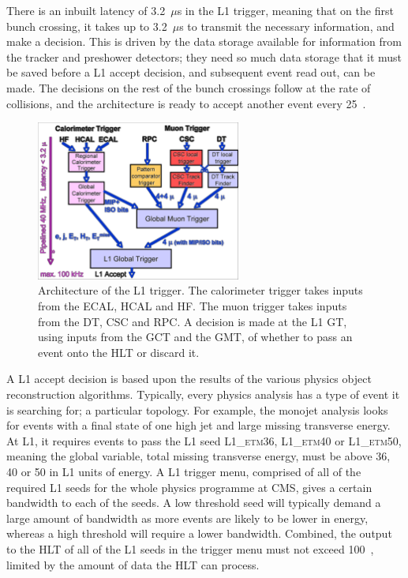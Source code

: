 There is an inbuilt latency of 3.2~$\mu$s in the \ac{L1} trigger, meaning that on the first bunch crossing, it takes up to 3.2~$\mu$s to transmit the necessary information, and make a decision. 
This is driven by the data storage available for information from the tracker and preshower detectors; 
they need so much data storage that it must be saved before a L1 accept decision, and subsequent event read out, can be made.
The decisions on the rest of the bunch crossings follow at the rate of collisions, and the architecture is ready to accept another event every 25~\ns.


\begin{figure}[htbp]
  \begin{center}
  \includegraphics[width=0.6\textwidth]{Figures/detector/L1TriggerArch.pdf}
  \caption{Architecture of the \ac{L1} trigger. The calorimeter trigger takes inputs from the \ac{ECAL}, \ac{HCAL} and \ac{HF}. The muon trigger takes inputs from the \ac{DT}, \ac{CSC} and \ac{RPC}. A decision is made at the L1 \ac{GT}, using inputs from the \ac{GCT} and the \ac{GMT}, of whether to pass an event onto the \ac{HLT} or discard it.
}
  \label{fig:L1triggerArch}
  \end{center}
\end{figure}

A \ac{L1} accept decision is based upon the results of the various physics object reconstruction algorithms.
Typically, every physics analysis has a type of event it is searching for; a particular topology. 
For example, the monojet analysis looks for events with a final state of one high \pt jet and large missing transverse energy. 
At L1, it requires events to pass the L1 seed \textsc{L1\_etm36}, \textsc{L1\_etm40} or \textsc{L1\_etm50}, meaning the global variable, total missing transverse energy, must be above 36, 40 or 50 in \ac{L1} units of energy.
A L1 trigger menu, comprised of all of the required L1 seeds for the whole physics programme at \ac{CMS}, gives a certain bandwidth to each of the seeds. A low threshold seed will typically demand a large amount of bandwidth as more events are likely to be lower in energy, whereas a high threshold will require a lower bandwidth. 
Combined, the output to the \ac{HLT} of all of the L1 seeds in the trigger menu must not exceed 100~\Hz, limited by the amount of data the \ac{HLT} can process.


